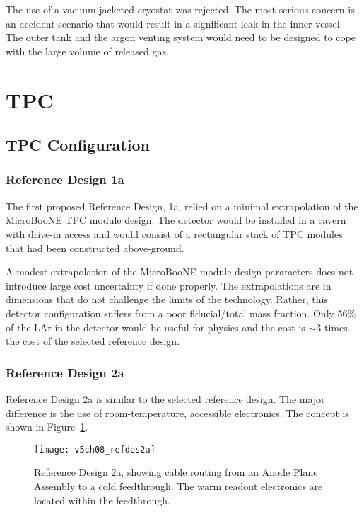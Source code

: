 The use of a vacuum-jacketed cryostat was rejected. The most serious concern is an accident scenario that would result in a significant leak in the inner vessel. The outer tank and the argon venting system would need to be designed to cope with the large volume of released gas.

\section{TPC}
\subsection{TPC Configuration}

\subsubsection{Reference Design 1a}

The first proposed Reference Design, 1a, relied on a minimal extrapolation of the MicroBooNE TPC module design. %
The detector would be installed in a cavern with drive-in access and would consist of a rectangular stack of TPC modules that had been constructed above-ground.

A modest extrapolation of the MicroBooNE module design parameters does not introduce large cost uncertainty if done properly. The extrapolations are in dimensions that do not challenge the limits of the technology. Rather, this detector configuration suffers from a poor fiducial/total mass fraction. Only 56\% of the LAr in the detector would be useful for physics and the cost is $\sim$3 times the cost of the selected reference design.

\subsubsection{Reference Design 2a}

Reference Design 2a is similar to the selected reference design. The major difference is the use of room-temperature, accessible electronics. The concept is shown in Figure~\ref{fig:refdes2a}.

\begin{figure}[h]
\centering
\texttt{[image: v5ch08\_refdes2a]}
\caption[Alternate cable routing from an APA to a cold feedthrough]{Reference Design 2a, showing cable routing from an Anode Plane Assembly to a cold feedthrough. The warm readout electronics are located within the feedthrough. }
\label{fig:refdes2a}
\end{figure}

